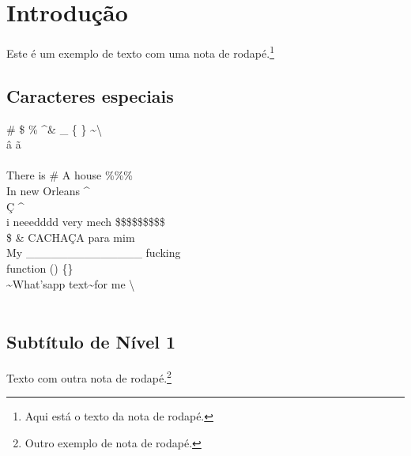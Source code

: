 \documentclass[12pt,a4paper,oneside,brazil]{abntex2}
\begin{document}

\listoffigures   %
\clearpage

\listoftables    %
\clearpage

\printglossary[type=abrev,title=LISTA DE ABREVIATURAS]
\clearpage

\printglossary[type=siglas,title=LISTA DE SIGLAS]
\clearpage

\printglossary[type=simbolos,title=LISTA DE SÍMBOLOS]
\clearpage

\tableofcontents
\clearpage



\setcounter{page}{1}
\textual

\justifying
\normalfont

\chapter{Introdução}
Este é um exemplo de texto com uma nota de rodapé.\footnote{Aqui está o texto da nota de rodapé.} \lipsum[1]

\section{Caracteres especiais}
\#     \$     \%     \textasciicircum     \&     \_     \{     \}     \textasciitilde     \textbackslash \\
â ã
\\
\\
There is \# A house \%\%\%\\
In new Orleans \textasciicircum \\
Ç \textasciicircum \\
i neeedddd very mech \$\$\$\$\$\$\$\$\$\\
\$ \& CACHAÇA para mim\\
My \_\_\_\_\_\_\_\_\_\_\_\_\_\_ fucking\\
function () \{\}\\
\textasciitilde What'sapp text\textasciitilde  for me \textbackslash\\\\

\section{Subtítulo de Nível 1}
Texto com outra nota de rodapé.\footnote{Outro exemplo de nota de rodapé.} \lipsum[2-3]
\end{document}
